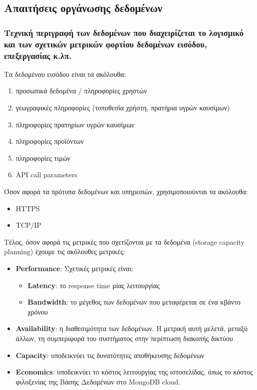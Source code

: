 
\subsection{Απαιτήσεις οργάνωσης δεδομένων}


\subsubsection{Τεχνική περιγραφή των δεδομένων που διαχειρίζεται το λογισμικό και των σχετικών μετρικών φορτίου δεδομένων εισόδου, επεξεργασίας κ.λπ.}
Τα δεδομένου εισόδου είναι τα ακόλουθα:
\begin{enumerate}
    \item προσωπικά δεδομένα / πληροφορίες χρηστών
    \item γεωγραφικές πληροφορίες (τοποθεσία χρήστη, πρατήρια υγρών καυσίμων)
    \item πληροφορίες πρατηρίων υγρών καυσίμων
    \item πληροφορίες προϊόντων
    \item πληροφορίες τιμών
    \item API call parameters
\end{enumerate}


Όσον αφορά τα πρότυπα δεδομένων και υπηρεσιών, χρησιμοποιούνται τα ακόλουθα:
\begin{itemize}
    \item HTTPS
    \item TCP/IP
\end{itemize}

Τέλος, όσον αφορά τις μετρικές που σχετίζονται με τα δεδομένα (storage capacity planning) έχουμε τις ακόλουθες μετρικές:
\begin{itemize}
    \item \textbf{Performance}: Σχετικές μετρικές είναι:
    \begin{itemize}
        \item \textbf{Latency}: το response time μίας λειτουργίας
        \item \textbf{Bandwidth}: το μέγεθος των δεδομένων που μεταφέρεται σε ένα κβάντο χρόνου
    \end{itemize}
    \item \textbf{Availability}: η διαθεσιμότητα των δεδομένων. Η μετρική αυτή μελετά, μεταξύ άλλων, τη συμπεριφορά του συστήματος στην περίπτωση διακοπής δικτύου   
    \item \textbf{Capacity}: υποδεικνύει τις δυνατότητες αποθήκευσης δεδομένων
    \item \textbf{Economics}: υποδεικνύει το κόστος λειτουργίας της ιστοσελίδας, όπως το κόστος φιλοξενίας της Βάσης Δεδομένων στο MongoDB cloud.
\end{itemize}



